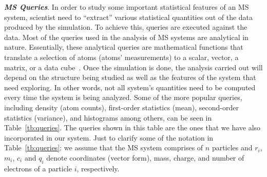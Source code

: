 \documentclass[10pt,journal,final,letterpaper,twocolumn]{IEEEtran}
\begin{document}
\textbf{\emph{MS Queries}}. In order to study some important
statistical features of an MS system, scientist need to ``extract''
various statistical quantities out of the data produced by the
simulation. To achieve this, queries are executed against the data.
Most of the queries used in the analysis of MS systems are
analytical in nature. Essentially, these analytical queries are
mathematical functions that translate a selection of atoms (atoms'
measurements) to a scalar, vector, a matrix, or a data
cube~\cite{SimDB}. Once the simulation is done, the analysis carried
out will depend on the structure being studied as well as the
features of the system that need exploring. In other words, not all
system's quantities need to be computed every time the system is
being analyzed. Some of the more popular queries, including density
(atom counts), first-order statistics (mean), second-order
statistics (variance), and histograms among others, can be seen in
Table~\ref{tb:queries}. The queries shown in this table are the ones
that we have also incorporated in our system. Just to clarify some
of the notation in Table~\ref{tb:queries}: we assume that the MS
system comprises of $n$ particles and $r_i$, $m_i$, $c_i$ and $q_i$
denote coordinates (vector form), mass, charge, and number of
electrons of a particle $i$, respectively.
\end{document}
